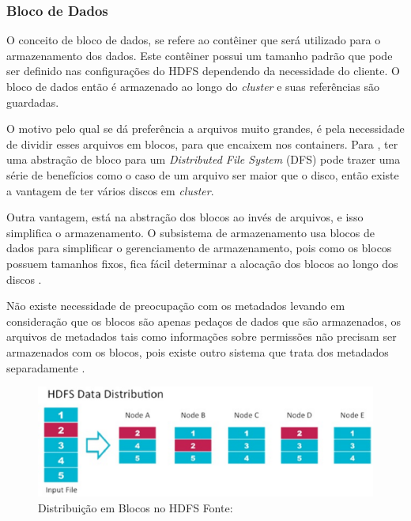             \subsubsection{Bloco de Dados}

                O conceito de bloco de dados, se refere ao contêiner que será utilizado para o armazenamento
                dos dados. Este contêiner possui um tamanho padrão que pode ser definido nas configurações
                do HDFS dependendo da necessidade do cliente. O bloco de dados então é armazenado ao longo
                do \textit{cluster} e suas referências são guardadas.

                O motivo pelo qual se dá preferência a arquivos muito grandes, é pela necessidade de dividir
                esses arquivos em blocos, para que encaixem nos containers. Para ,
                ter uma abstração de bloco para um \textit{Distributed File System} (DFS) pode trazer uma série
                de benefícios como o caso de um arquivo ser maior que o disco, então existe a vantagem de ter
                vários discos em \textit{cluster}.

                Outra vantagem, está na abstração dos blocos ao invés de arquivos, e isso simplifica o
                armazenamento. O subsistema de armazenamento usa blocos de dados para simplificar
                o gerenciamento de armazenamento, pois como os blocos possuem tamanhos fixos, fica
                fácil determinar a alocação dos blocos ao longo dos discos \cite{white2015}.

                Não existe necessidade de preocupação com os metadados levando em consideração
                que os blocos são apenas pedaços de dados que são armazenados, os arquivos de
                metadados tais como informações sobre permissões não precisam ser armazenados com
                os blocos, pois existe outro sistema que trata dos metadados separadamente
                \cite{shvachko2010}.

                \begin{figure}[ht!]
                    \centering
                    \includegraphics[keepaspectratio=true,scale=0.75]
                        {figuras/figura1.eps}
                    \caption[Distribuição em Blocos no HDFS]{Distribuição em Blocos no HDFS
                    \protect\linebreak Fonte: }
                    \label{figura1}
                \end{figure}

